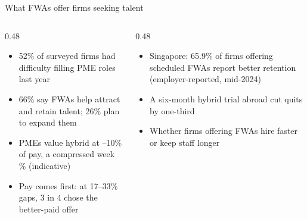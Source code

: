 \begin{frame}[t,label=B-talent]{What FWAs offer firms seeking talent}
  \FrameTop
  \begin{columns}[T,onlytextwidth]
    \begin{column}{0.48\textwidth}
      \begin{itemize}\setlength{\itemsep}{0.08cm}
        \item 52\% of surveyed firms had difficulty filling PME roles last year
        \item 66\% say FWAs help attract and retain talent; 26\% plan to expand them
        \item PMEs value hybrid at --10\% of pay, a compressed week \% (indicative)
        \item Pay comes first: at 17--33\% gaps, 3 in 4 chose the better-paid offer
      \end{itemize}
    \end{column}
    \begin{column}{0.48\textwidth}
      \begin{itemize}\setlength{\itemsep}{0.08cm}
        \item Singapore: 65.9\% of firms offering scheduled FWAs report better retention (employer-reported, mid-2024)
        \item A six-month hybrid trial abroad cut quits by one-third
      \end{itemize}
      \vspace{0.12cm}
      \begin{itemize}\setlength{\itemsep}{0.08cm}
        \item Whether firms offering FWAs hire faster or keep staff longer
      \end{itemize}
    \end{column}
  \end{columns}
\end{frame}

